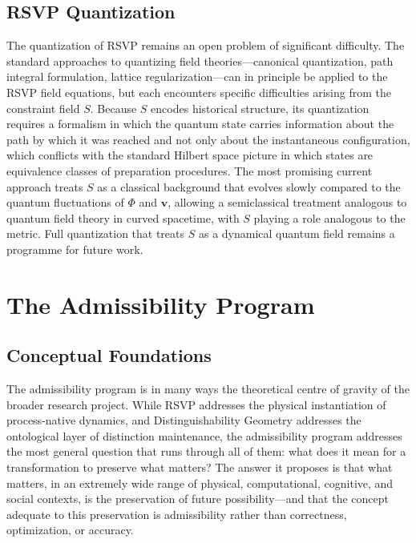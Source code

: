 \documentclass[11pt, oneside]{book}
\theoremstyle{definition}
\theoremstyle{remark}
\begin{document}
\section{RSVP Quantization}

The quantization of RSVP remains an open problem of significant difficulty. The standard approaches to quantizing field theories—canonical quantization, path integral formulation, lattice regularization—can in principle be applied to the RSVP field equations, but each encounters specific difficulties arising from the constraint field $S$. Because $S$ encodes historical structure, its quantization requires a formalism in which the quantum state carries information about the path by which it was reached and not only about the instantaneous configuration, which conflicts with the standard Hilbert space picture in which states are equivalence classes of preparation procedures. The most promising current approach treats $S$ as a classical background that evolves slowly compared to the quantum fluctuations of $\Phi$ and $\mathbf{v}$, allowing a semiclassical treatment analogous to quantum field theory in curved spacetime, with $S$ playing a role analogous to the metric. Full quantization that treats $S$ as a dynamical quantum field remains a programme for future work.

\chapter{The Admissibility Program}

\section{Conceptual Foundations}

The admissibility program is in many ways the theoretical centre of gravity of the broader research project. While RSVP addresses the physical instantiation of process-native dynamics, and Distinguishability Geometry addresses the ontological layer of distinction maintenance, the admissibility program addresses the most general question that runs through all of them: what does it mean for a transformation to preserve what matters? The answer it proposes is that what matters, in an extremely wide range of physical, computational, cognitive, and social contexts, is the preservation of future possibility—and that the concept adequate to this preservation is admissibility rather than correctness, optimization, or accuracy.
\end{document}
